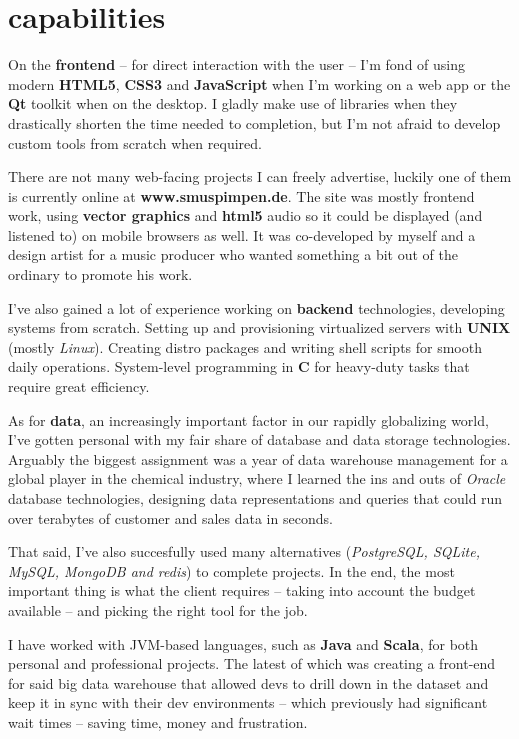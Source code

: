 \documentclass[]{friggeri-cv}
\begin{document}
\section{capabilities}

On the \textbf{frontend} -- for direct interaction with the user -- I'm fond of using modern \textbf{HTML5}, \textbf{CSS3} and \textbf{JavaScript} when I'm working on a web app or the \textbf{Qt} toolkit when on the desktop. I gladly make use of libraries when they drastically shorten the time needed to completion, but I'm not afraid to develop custom tools from scratch when required.

There are not many web-facing projects I can freely advertise, luckily one of them is currently online at \textbf{www.smuspimpen.de}. The site was mostly frontend work, using \textbf{vector graphics} and \textbf{html5} audio so it could be displayed (and listened to) on mobile browsers as well. It was co-developed by myself and a design artist for a music producer who wanted something a bit out of the ordinary to promote his work.

I've also gained a lot of experience working on \textbf{backend} technologies, developing systems from scratch. Setting up and provisioning virtualized servers with \textbf{UNIX} (mostly \emph{Linux}). Creating distro packages and writing shell scripts for smooth daily operations. System-level programming in \textbf{C} for heavy-duty tasks that require great efficiency.

As for \textbf{data}, an increasingly important factor in our rapidly globalizing world, I've gotten personal with my fair share of database and data storage technologies. Arguably the biggest assignment was a year of data warehouse management for a global player in the chemical industry, where I learned the ins and outs of \emph{Oracle} database technologies, designing data representations and queries that could run over terabytes of customer and sales data in seconds.

That said, I've also succesfully used many alternatives (\emph{PostgreSQL, SQLite, MySQL, MongoDB and redis}) to complete projects. In the end, the most important thing is what the client requires -- taking into account the budget available -- and picking the right tool for the job.

I have worked with JVM-based languages, such as \textbf{Java} and \textbf{Scala}, for both personal and professional projects. The latest of which was creating a front-end for said big data warehouse that allowed devs to drill down in the dataset and keep it in sync with their dev environments -- which previously had significant wait times -- saving time, money and frustration.
\end{document}
